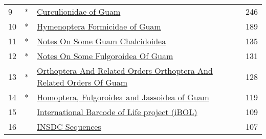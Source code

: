\begin{longtable}{llp{5in}r}
9  &  * &                                                                                                                                                                            \href{https://www.gbif.org/dataset/d0309e8b-3179-4162-946c-08cef1c82013}{Curculionidae of Guam} &           246 \\
10 &  * &                                                                                                                                                                   \href{https://www.gbif.org/dataset/6dc2872d-cbab-4982-baed-c0969e3e3236}{Hymenoptera Formicidae of Guam} &           189 \\
11 &  * &                                                                                                                                                                  \href{https://www.gbif.org/dataset/2eb23bc8-fdf6-422e-afde-a708a845592c}{Notes On Some Guam Chalcidoidea} &           135 \\
12 &  * &                                                                                                                                                                \href{https://www.gbif.org/dataset/8ddfacbb-c42b-4385-b70b-ea5bd759c377}{Notes On Some Fulgoroidea Of Guam} &           131 \\
13 &  * &                                                                                                                              \href{https://www.gbif.org/dataset/16f6ef92-619b-417b-946c-22d9b1445e7d}{Orthoptera And Related Orders Orthoptera And Related Orders Of Guam} &           128 \\
14 &  * &                                                                                                                                                     \href{https://www.gbif.org/dataset/62345736-dcf6-4c38-a870-36a90992dabb}{Homoptera, Fulgoroidea and Jassoidea of Guam} &           119 \\
15 &    &                                                                                                                                                     \href{https://www.gbif.org/dataset/040c5662-da76-4782-a48e-cdea1892d14c}{International Barcode of Life project (iBOL)} &           109 \\
16 &    &                                                                                                                                                                                  \href{https://www.gbif.org/dataset/d8cd16ba-bb74-4420-821e-083f2bac17c2}{INSDC Sequences} &           107 \\

\end{longtable}
